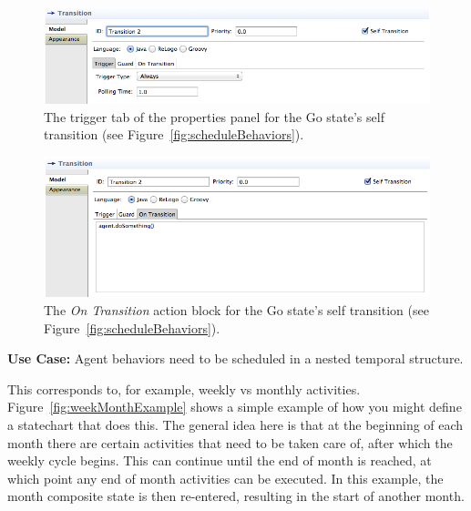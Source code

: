 \documentclass[11pt]{amsart}
\begin{document}
\begin{figure}
\begin{center}
\vspace{.2in}
\centerline {
\includegraphics[width=5in]{StatechartsImages/GoTrigger.png}
}
\caption{The trigger tab of the properties panel for the Go state's self transition (see Figure~\ref{fig:scheduleBehaviors}).}
\label{fig:goTrigger}
\end{center}
\end{figure}

\begin{figure}
\begin{center}
\vspace{.2in}
\centerline {
\includegraphics[width=5in]{StatechartsImages/GoOnTransition.png}
}
\caption{The \emph{On Transition} action block for the Go state's self transition (see Figure~\ref{fig:scheduleBehaviors}).}
\label{fig:goOnTransition}
\end{center}
\end{figure}
\clearpage

\textbf{Use Case:} Agent behaviors need to be scheduled in a nested temporal structure.

This corresponds to, for example, weekly vs monthly activities. Figure~\ref{fig:weekMonthExample} shows a simple example of how you might define a statechart that does this. The general idea here is that at the beginning of each month there are certain activities that need to be taken care of, after which the weekly cycle begins. This can continue until the end of month is reached, at which point any end of month activities can be executed. In this example, the month composite state is then re-entered, resulting in the start of another month.
\end{document}
